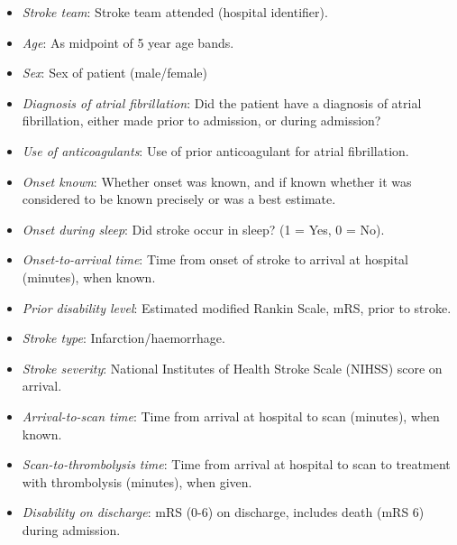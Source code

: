 \begin{itemize}

    \item \textit{Stroke team}: Stroke team attended (hospital identifier).

    \item \textit{Age}: As midpoint of 5 year age bands.

    \item \textit{Sex}: Sex of patient (male/female)

    \item \textit{Diagnosis of atrial fibrillation}: Did the patient have a diagnosis of atrial fibrillation, either made prior to admission, or during admission?

    \item \textit{Use of anticoagulants}: Use of prior anticoagulant for atrial fibrillation.

    \item \textit{Onset known}: Whether onset was known, and if known whether it was considered to be known precisely or was a best estimate.

    \item \textit{Onset during sleep}: Did stroke occur in sleep? (1 = Yes, 0 = No).

    \item \textit{Onset-to-arrival time}: Time from onset of stroke to arrival at hospital (minutes), when known.

    \item \textit{Prior disability level}: Estimated modified Rankin Scale, mRS, prior to stroke.

    \item \textit{Stroke type}: Infarction/haemorrhage.

    \item \textit{Stroke severity}: National Institutes of Health Stroke Scale (NIHSS) score on arrival.

    \item \textit{Arrival-to-scan time}: Time from arrival at hospital to scan (minutes), when known.

    \item \textit{Scan-to-thrombolysis time}: Time from arrival at hospital to scan to treatment with thrombolysis  (minutes), when given.

    \item \textit{Disability on discharge}: mRS (0-6) on discharge, includes death (mRS 6) during admission.
    
\end{itemize}


